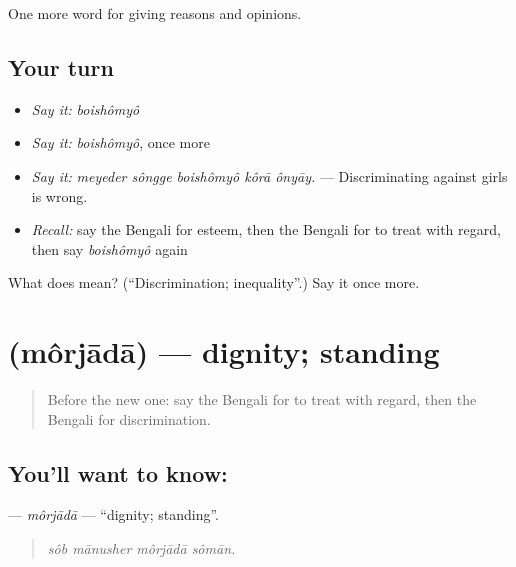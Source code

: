 \begin{grammarlens}[title={What you've built}]
One more word for giving reasons and opinions.
\end{grammarlens}

\subsection*{Your turn}
\begin{itemize}
\raggedright
  \item \emph{Say it:} \emph{boishômyô}
  \item \emph{Say it:} \emph{boishômyô}, once more
  \item \emph{Say it:} \emph{meyeder sôngge boishômyô kôrā ônyāy.} — Discriminating against girls is wrong.
  \item \emph{Recall:} say the Bengali for esteem, then the Bengali for to treat with regard, then say \emph{boishômyô} again
\end{itemize}

\begin{tcolorbox}[breakable,colback=teal!4,colframe=teal!35!black,title={Before you move on}]
What does  mean? (\textquotedblleft{}Discrimination; inequality\textquotedblright{}.) Say it once more.
\end{tcolorbox}
\section[\texorpdfstring{\bn{মর্যাদা} (môrjādā)}{মর্যাদা (môrjādā)}]{ (môrjādā) — dignity; standing}

\label{lesson:BN-C352-morjada}



\begin{quote}
Before the new one: say the Bengali for to treat with regard, then the Bengali for discrimination.
\end{quote}

\subsection*{You'll want to know: }
\textbf{} — \emph{môrjādā} — \textquotedblleft{}dignity; standing\textquotedblright{}.

\begin{quote}
   
\end{quote}

\begin{quote}
\emph{sôb mānusher môrjādā sômān.}
\end{quote}

